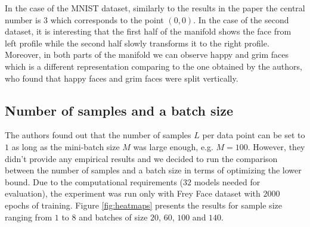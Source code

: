 \documentclass[../report/report.tex]{subfiles}
\begin{document}
In the case of the MNIST dataset, similarly to the results in the paper the central number is $3$ which corresponds to the point $(0,0)$. In the case of the second dataset, it is interesting that the first half of the manifold shows the face from left profile while the second half slowly transforms it to the right profile. Moreover, in both parts of the manifold we can observe happy and grim faces which is a different representation comparing to the one obtained by the authors, who found that happy faces and grim faces were split vertically.

\subsection{Number of samples and a batch size}
The authors found out that the number of samples $L$ per data point can be set to $1$ as long as the mini-batch size $M$ was large enough, e.g. $M = 100$. However, they didn't provide any empirical results and we decided to run the comparison between the number of samples and a batch size in terms of optimizing the lower bound. Due to the computational requirements ($32$ models needed for evaluation), the experiment was run only with Frey Face dataset with $2000$ epochs of training. Figure \ref{fig:heatmaps} presents the results for sample size ranging from $1$ to $8$ and batches of size $20$, $60$, $100$ and $140$.
\end{document}
